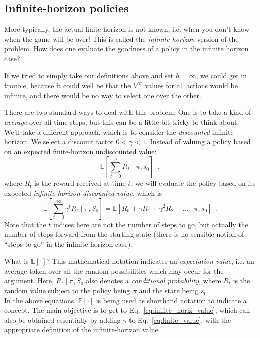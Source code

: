 \subsection{Infinite-horizon policies}
\label{sec:mdp_infinite_horizon}
\label{sec:discount}

More typically, the actual finite horizon is not known, i.e. when you
don't know when the game will be over!  This is called the {\em
  infinite horizon} version of the problem.  How does one evaluate the
goodness of a policy in the infinite horizon case?

If we tried to simply take our definitions above and set $h = \infty$, 
we could get in trouble, because it could well be that the
$V^\infty$ values for all actions would be infinite, and there would
be no way to select one over the other.

There are two standard ways to deal with this problem.  One is to take
a kind of {\em average} over all time steps, but this can be a little
bit  tricky to think about.  We'll take a  different  approach,  which
is to  consider the {\em discounted} infinite horizon.   We select a 
discount factor $0 < \gamma < 1$. Instead of valuing a policy
based on an expected finite-horizon undiscounted value: 
\begin{equation}
 \mathbb{E}\left[\sum_{t = 0}^{h}R_t \mid \pi, s_0\right]\;\;, 
\end{equation}
where $R_t$ is the reward received at time $t$, we will evaluate the policy based on its expected {\it{infinite horizon
    discounted value}}, 
which is 
\begin{equation}
 \mathbb{E}\left[\sum_{t = 0}^{\infty}\gamma^tR_t \mid \pi, S_0\right] 
   = \mathbb{E}\left[R_0  + \gamma R_1 + \gamma^2 R_2 + \ldots \mid \pi,  s_0\right] \;\;.
\end{equation}
Note that the $t$ indices here are not the number of steps to go, but
actually the number of steps forward from the starting state (there is
no sensible notion  of ``steps to go'' in the infinite horizon case).

\begin{examplebox}
What is $\mathbb{E}\left[ \cdot \right ]$?  This mathematical notation
  indicates an {\em expectation value}, i.e. an average taken over all
  the random possibilities which may occur for the argument.  Here,
  $R_t \mid \pi, S_0$ also denotes a {\em conditional probability},
  where $R_t$ is the random value subject to the policy being $\pi$
  and the state being $s_0$.
%
~\\[1.5ex]
%
  In the above equations, $\mathbb{E}\left[ \cdot \right ]$ is being
  used as shorthand notation to indicate a concept.  The main
  objective is to get to Eq.~\ref{eq:inifite_horiz_value}, which can
  also be obtained essentially by adding $\gamma$ to
  Eq.~\ref{eq:finite_value}, with the appropriate definition of the infinite-horizon value.
\end{examplebox}

